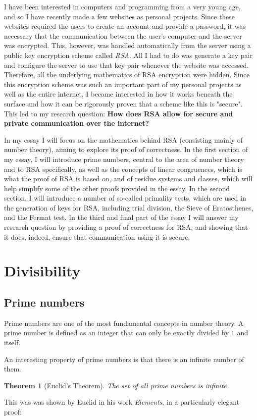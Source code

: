 \documentclass[12pt, titlepage]{article}
\newtheorem{theorem}{Theorem}
\let\oldsection\section
\renewcommand\section{\clearpage\oldsection}
\begin{document}
I have been interested in computers and programming from a very young age, and so I have
recently made a few websites as personal projects. Since these websites required the users
to create an account and provide a password, it was necessary that the communication between
the user's computer and the server was encrypted. This, however, was handled automatically
from the server using a public key encryption scheme called \emph{RSA}. All I had to do was
generate a key pair and configure the server to use that key pair whenever the website was
accessed.  Therefore, all the underlying mathematics of RSA encryption were hidden. Since
this encryption scheme was such an important part of my personal projects as well as the
entire internet, I became interested in how it works beneath the surface and how it can be
rigorously proven that a scheme like this is "secure". This led to my research question:
\textbf{How does RSA allow for secure and private communication over the internet?}

In my essay I will focus on the mathematics behind RSA (consisting mainly of number theory),
aiming to explore its proof of correctness. In the first section of my essay, I will
introduce prime numbers, central to the area of number theory and to RSA specifically, as
well as the concepts of linear congruences, which is what the proof of RSA is based on, and
of residue systems and classes, which will help simplify some of the other proofs provided
in the essay. In the second section, I will introduce a number of so-called primality tests,
which are used in the generation of keys for RSA, including trial division, the Sieve of
Eratosthenes, and the Fermat test. In the third and final part of the essay I will answer my
research question by providing a proof of correctness for RSA, and showing that it does,
indeed, ensure that communication using it is secure.

\section{Divisibility}

\subsection{Prime numbers}

Prime numbers are one of the most fundamental concepts in number theory. A prime number is
defined as an integer that can only be exactly divided by $1$ and itself.

An interesting property of prime numbers is that there is an infinite number of them. 
%
\begin{theorem}[Euclid's Theorem]
    The set of all prime numbers is infinite.
\end{theorem}
%
This was was shown by Euclid in his work \emph{Elements}, in a particularly elegant
proof\autocite[19]{dence}:
\end{document}
